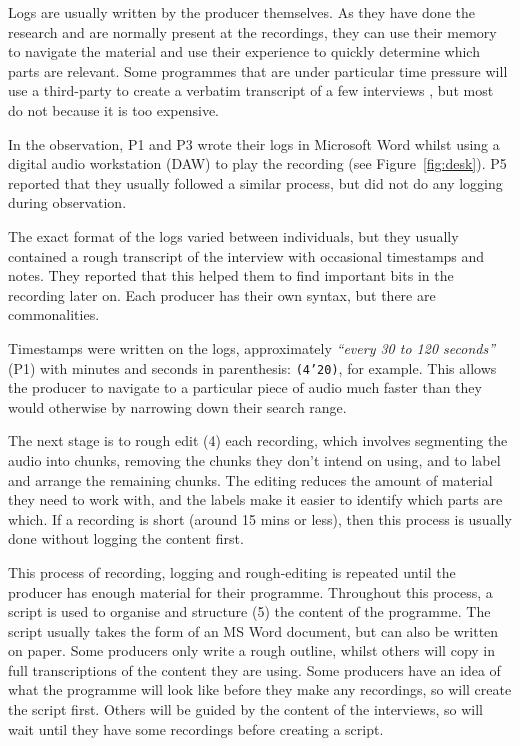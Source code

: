 Logs are usually written by the producer themselves. As they have done the research and are normally present at the
recordings, they can use their memory to navigate the material and use their experience to quickly determine which
parts are relevant. Some programmes that are under particular time pressure will use a third-party to create a verbatim
transcript of a few interviews \citep{Baume2015}, but most do not because it is too expensive.

In the observation, P1 and P3 wrote their logs in Microsoft Word whilst using a digital audio workstation (DAW) to play
the recording (see Figure~\ref{fig:desk}). P5 reported that they usually followed a similar process, but did not do any
logging during observation.

The exact format of the logs varied between individuals, but they usually contained a rough transcript of the interview
with occasional timestamps and notes. They reported that this helped them to find important bits in the recording later
on. Each producer has their own syntax, but there are commonalities.

Timestamps were written on the logs, approximately \textit{``every 30 to 120 seconds''} (P1) with minutes and seconds
in parenthesis: \texttt{(4'20)}, for example.  This allows the producer to navigate to a particular piece of audio much
faster than they would otherwise by narrowing down their search range.

The next stage is to rough edit (4) each recording, which involves segmenting the audio into chunks, removing the
chunks they don't intend on using, and to label and arrange the remaining chunks.  The editing reduces the amount of
material they need to work with, and the labels make it easier to identify which parts are which.  If a recording is
short (around 15 mins or less), then this process is usually done without logging the content first.

This process of recording, logging and rough-editing is repeated until the producer has enough material for their
programme. Throughout this process, a script is used to organise and structure (5) the content of the programme.  The
script usually takes the form of an MS Word document, but can also be written on paper. Some producers only write a
rough outline, whilst others will copy in full transcriptions of the content they are using.  Some producers have an
idea of what the programme will look like before they make any recordings, so will create the script first. Others will
be guided by the content of the interviews, so will wait until they have some recordings before creating a script.

